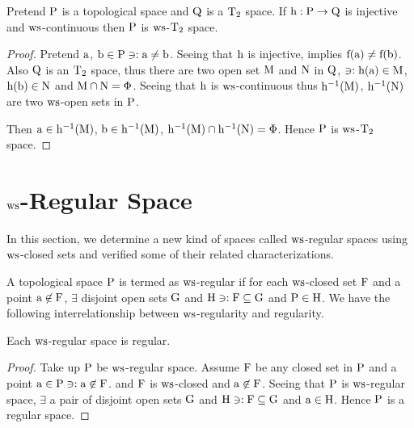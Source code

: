 \begin{thm}\label{thm8.2.20}
Pretend $\mathrm{P}$ is a topological space and $\mathrm{Q}$ is a $\mathrm{T}_{2}$ space. If $\mathrm{h}: \mathrm{P} \to \mathrm{Q}$ is injective and $\mathrm{ws}$-continuous then $\mathrm{P}$ is $\mathrm{ws}$-$\mathrm{T}_{2}$ space.
\end{thm}

\begin{proof}
Pretend $\mathrm{a}$, $\mathrm{b} \in \mathrm{P} \ni: \mathrm{a} \neq \mathrm{b}$. Seeing that $\mathrm{h}$ is injective, implies $\mathrm{f}(\mathrm{a}) \neq \mathrm{f}(\mathrm{b})$. Also $\mathrm{Q}$ is an $\mathrm{T}_{2}$ space, thus there are two open set $\mathrm{M}$ and $\mathrm{N}$ in $\mathrm{Q}$, $\ni: \mathrm{h}(\mathrm{a}) \in \mathrm{M}$, $\mathrm{h}(\mathrm{b}) \in \mathrm{N}$ and $\mathrm{M}\cap\mathrm{N} =\Phi$. Seeing that $\mathrm{h}$ is $\mathrm{ws}$-continuous thus $\mathrm{h}^{-1} (\mathrm{M})$, $\mathrm{h}^{-1} (\mathrm{N})$ are two $\mathrm{ws}$-open sets in $\mathrm{P}$.

Then $\mathrm{a} \in \mathrm{h}^{-1} (\mathrm{M})$, $\mathrm{b} \in \mathrm{h}^{-1} (\mathrm{M})$, $\mathrm{h}^{-1} (\mathrm{M}) \cap \mathrm{h}^{-1} (\mathrm{N}) =\Phi$. Hence $\mathrm{P}$ is $\mathrm{ws}$-$\mathrm{T}_{2}$ space.
\end{proof}

\section{\boldmath$\mathrm{ws}$-Regular Space}\label{sec8.3}

In this section, we determine a new kind of spaces called $\mathrm{ws}$-regular spaces using $\mathrm{ws}$-closed sets and verified some of their related characterizations.

\begin{dfn}\label{defi8.3.1}
A topological space $\mathrm{P}$ is termed as $\mathrm{ws}$-regular if for each $\mathrm{ws}$-closed set $\mathrm{F}$ and a point $\mathrm{a} \not\in \mathrm{F}$, $\exists$ disjoint open sets $\mathrm{G}$ and $\mathrm{H} \ni: \mathrm{F} \subseteq \mathrm{G}$ and $\mathrm{P} \in \mathrm{H}$. We have the following interrelationship between $\mathrm{ws}$-regularity and regularity.
\end{dfn}

\begin{thm}\label{thm8.3.2}
Each $\mathrm{ws}$-regular space is regular.
\end{thm}

\begin{proof}
Take up $\mathrm{P}$ be $\mathrm{ws}$-regular space. Assume $\mathrm{F}$ be any closed set in $\mathrm{P}$ and a point $\mathrm{a} \in \mathrm{P} \ni: \mathrm{a} \not\in \mathrm{F}$. and $\mathrm{F}$ is $\mathrm{ws}$-closed and $\mathrm{a} \not\in \mathrm{F}$. Seeing that $\mathrm{P}$ is $\mathrm{ws}$-regular space, $\exists$ a pair of disjoint open sets $\mathrm{G}$ and $\mathrm{H} \ni: \mathrm{F} \subseteq \mathrm{G}$ and $\mathrm{a} \in \mathrm{H}$. Hence $\mathrm{P}$ is a regular space.
\end{proof}

